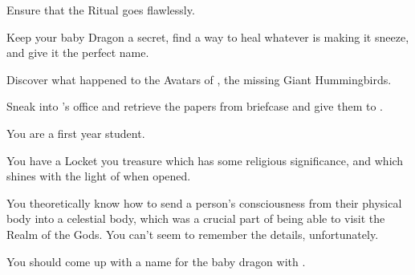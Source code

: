 \documentclass[char]{GL2020}
\begin{document}








\begin{itemz}[Goals]
	\item Ensure that the Ritual goes flawlessly.
	\item Keep your baby Dragon a secret, find a way to heal whatever is making it sneeze, and give it the perfect name.
	\item Discover what happened to the Avatars of \cFarmGod{}, the missing Giant Hummingbirds.
	\item Sneak into \cBunker{}’s office and retrieve the papers from  briefcase and give them to \cWildCard{}.
\end{itemz}

\begin{itemz}[Notes]
	\item You are a first year student.
	\item You have a Locket you treasure which has some religious significance, and which shines with the light of \cFarmGod{} when opened.
	\item You theoretically know how to send a person’s consciousness from their physical body into a celestial body, which was a crucial part of being able to visit the Realm of the Gods.  You can’t seem to remember the details, unfortunately.
	\item You should come up with a name for the baby dragon with \cPirateChild{}.
\end{itemz}
\end{document}
